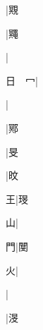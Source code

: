 \begin{multicols}{2}
{{}|{\cjk{}覭}\par
{}|{\cjk{}鼆}\par
{}|{}\par
{\cjk{}日{\cnsym{}　}{\cnxHanaA{}冖}}|{}\par
{}|{}\par
{}|{\cjk{}鄍}\par
{\cjk{}{\cnsym{}　}{\cnsym{}　}{\cnsym{}　}}|{\cjk{}旻}\par
{\cjk{}{\cnsym{}　}{\cnsym{}　}{\cnsym{}　}}|{\cjk{}旼}\par
{\cjk{}{\cnsym{}　}{\cnsym{}　}王}|{\cjk{}琝}\par
{\cjk{}{\cnsym{}　}{\cnsym{}　}山}|{}\par
{\cjk{}{\cnsym{}　}{\cnsym{}　}門}|{\cjk{}閺}\par
{\cjk{}{\cnsym{}　}{\cnsym{}　}火}|{}\par
{}|{}\par
{}|{\cjk{}渂}\par
}
\end{multicols}
